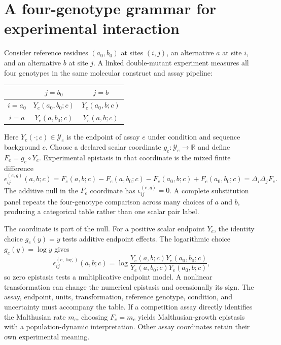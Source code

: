 \section{A four-genotype grammar for experimental interaction}
\label{sec:book-epistasis-primer}

Consider reference residues $(a_0,b_0)$ at sites $(i,j)$, an alternative $a$ at site $i$, and an
alternative $b$ at site $j$.  A linked double-mutant experiment measures all four genotypes in the
same molecular construct and assay pipeline:
\begin{center}
\small
\begin{tabular}{@{}c|cc@{}}
 & $j=b_0$ & $j=b$ \\
\hline
$i=a_0$ & $Y_e(a_0,b_0;c)$ & $Y_e(a_0,b;c)$ \\
$i=a$   & $Y_e(a,b_0;c)$   & $Y_e(a,b;c)$ \\
\end{tabular}
\end{center}
Here $Y_e(\cdot;c)\in\mathcal Y_e$ is the endpoint of assay $e$ under condition and sequence
background $c$.  Choose a declared scalar coordinate $g_e:\mathcal Y_e\to\mathbb R$ and define
$F_e=g_e\circ Y_e$.  Experimental epistasis in that coordinate is the mixed finite difference
\begin{equation}
\epsilon_{ij}^{(e,g)}(a,b;c)
=F_e(a,b;c)-F_e(a,b_0;c)-F_e(a_0,b;c)+F_e(a_0,b_0;c)
=\Delta_i\Delta_jF_e.
\label{eq:book-epistasis-primer}
\end{equation}
The additive null in the $F_e$ coordinate has $\epsilon_{ij}^{(e,g)}=0$.  A complete substitution panel repeats
the four-genotype comparison across many choices of $a$ and $b$, producing a categorical table
rather than one scalar pair label.

The coordinate is part of the null.  For a positive scalar endpoint $Y_e$, the identity choice
$g_e(y)=y$ tests additive endpoint effects.  The logarithmic choice $g_e(y)=\log y$ gives
\begin{equation}
\epsilon_{ij}^{(e,\log)}(a,b;c)
=\log\frac{Y_e(a,b;c)Y_e(a_0,b_0;c)}
{Y_e(a,b_0;c)Y_e(a_0,b;c)},
\end{equation}
so zero epistasis tests a multiplicative endpoint model.  A nonlinear transformation can change the
numerical epistasis and occasionally its sign.  The assay, endpoint, units, transformation, reference
genotype, condition, and uncertainty must accompany the table.  If a competition assay directly
identifies the Malthusian rate $m_c$, choosing $F_e=m_c$ yields Malthusian-growth epistasis with a
population-dynamic interpretation.  Other assay coordinates retain their own experimental meaning.

